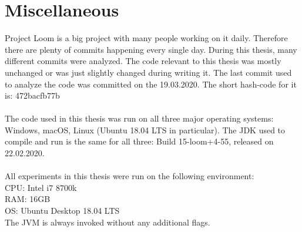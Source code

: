 \section{Miscellaneous}
Project Loom is a big project with many people working on it daily. Therefore there are plenty of commits happening every single day. During this thesis, many different commits were analyzed. The code relevant to this thesis was mostly unchanged or was just slightly changed during writing it. The last commit used to analyze the code was committed on the 19.03.2020. The short hash-code for it is: 472bacfb77b
\\
\\
The code used in this thesis was run on all three major operating systems: Windows, macOS, Linux (Ubuntu 18.04 LTS in particular). The JDK used to compile and run is the same for all three: Build 15-loom+4-55, released on 22.02.2020.
\\
\\
All experiments in this thesis were run on the following environment:
\\
CPU: Intel i7 8700k
\\
RAM: 16GB
\\
OS: Ubuntu Desktop 18.04 LTS
\\
The JVM is always invoked without any additional flags.

